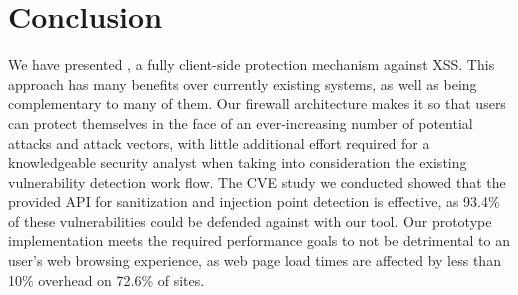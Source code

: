 \section{Conclusion}
We have presented \sys, a fully client-side protection mechanism against XSS. This approach has many benefits over currently existing systems, as well as being complementary to many of them. Our firewall architecture makes it so that users can protect themselves in the face of an ever-increasing number of potential attacks and attack vectors, with little additional effort required for a knowledgeable security analyst when taking into consideration the existing vulnerability detection work flow. The CVE study we conducted showed that the provided API for sanitization and injection point detection is effective, as 93.4\% of these vulnerabilities could be defended against with our tool. Our prototype implementation meets the required performance goals to not be detrimental to an user's web browsing experience, as web page load times are affected by less than 10\% overhead on 72.6\% of sites.
